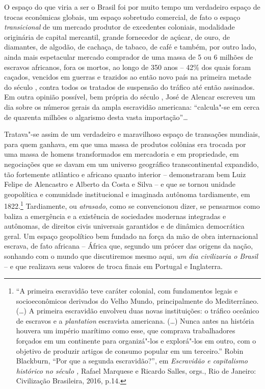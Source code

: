 O espaço do que viria a ser o Brasil foi por muito tempo um verdadeiro
espaço de trocas econômicas globais, um espaço sobretudo comercial, de
fato o espaço \emph{transicional} de um mercado produtor de excedentes
coloniais, modalidade originária de capital mercantil, grande fornecedor
de açúcar, de ouro, de diamantes, de algodão, de cachaça, de tabaco, de
café e também, por outro lado, ainda mais espetacular mercado comprador
de uma massa de 5 ou 6 milhões de escravos africanos, fora os mortos, ao
longo de 350 anos -- 42\% dos quais foram caçados, vencidos em guerras e
trazidos ao então novo país na primeira metade do século , contra
todos os tratados de suspensão do tráfico até então assinados. Em outra
opinião possível, bem própria do século , José de Alencar escreveu um
dia sobre os números gerais da ampla escravidão americana: ``calcula"-se
em cerca de quarenta milhões o algarismo desta vasta importação''\ldots{}

Tratava"-se assim de um verdadeiro e maravilhoso espaço de transações
mundiais, para quem ganhava, em que uma massa de produtos colônias era
trocada por uma massa de homens transformados em mercadoria e em
propriedade, em negociações que se davam em um universo geográfico
transcontinental expandido, tão fortemente atlântico e africano quanto
interior -- demonstraram bem Luiz Felipe de Alencastro e Alberto da
Costa e Silva -- e que se tornou unidade geopolítica e comunidade
institucional e imaginada autônoma tardiamente, em 1822.\footnote{``A
  primeira escravidão teve caráter colonial, com fundamentos legais e
  socioeconômicos derivados do Velho Mundo, principalmente do
  Mediterrâneo. (\ldots{}) A primeira escravidão envolveu duas novas
  instituições: o tráfico oceânico de escravos e a \emph{plantation}
  escravista americana. (\ldots{}) Nunca antes na história houvera um império
  marítimo como esse, que comprava trabalhadores forçados em um
  continente para organizá"-los e explorá"-los em outro, com o objetivo de
  produzir artigos de consumo popular em um terceiro.'' Robin Blackburn,
  ``Por que a segunda escravidão?'', em \emph{Escravidão e capitalismo
  histórico no século ,} Rafael Marquese e Ricardo Salles, orgs., Rio
  de Janeiro: Civilização Brasileira, 2016, p.14.} Tardiamente, ou
\emph{atrasado}, como se convencionou dizer, se pensarmos como baliza a
emergência e a existência de sociedades modernas integradas e autônomas,
de direitos civis universais garantidos e de dinâmica democrática geral.
Um espaço geopolítico bem fundado na força da mão de obra internacional
escrava, de fato africana -- África que, segundo um prócer das origens
da nação, sonhando com o mundo que discutiremos mesmo aqui, \emph{um}
\emph{dia civilizaria o Brasil} -- e que realizava seus valores de troca
finais em Portugal e Inglaterra.


